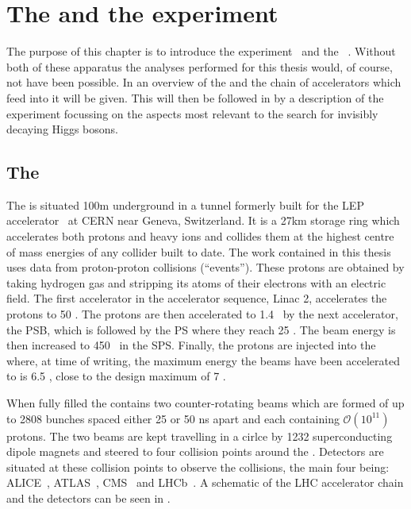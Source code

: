 \chapter{The \LHC and the \CMS experiment}
\label{chap:detector}

The purpose of this chapter is to introduce the \CMS experiment~\cite{Chatrchyan:2008aa} and the \LHC~\cite{1748-0221-3-08-S08001}. Without both of these apparatus the analyses performed for this thesis would, of course, not have been possible. In  an overview of the \LHC and the chain of accelerators which feed into it will be given. This will then be followed in  by a description of the \CMS experiment focussing on the aspects most relevant to the search for invisibly decaying Higgs bosons.

\section{The \LHC}
\label{sec:lhc}
The \LHC is situated 100m underground in a tunnel formerly built for the LEP accelerator~\cite{lepdesign} at CERN near Geneva, Switzerland. It is a 27km storage ring which accelerates both protons and heavy ions and collides them at the highest centre of mass energies of any collider built to date. The work contained in this thesis uses data from proton-proton collisions (``events''). These protons are obtained by taking hydrogen gas and stripping its atoms of their electrons with an electric field. The first accelerator in the \LHC accelerator sequence, Linac 2, accelerates the protons to 50 \MeV. The protons are then accelerated to 1.4 \GeV~by the next accelerator, the \ac{PSB}, which is followed by the \ac{PS} where they reach 25 \GeV. The beam energy is then increased to 450 \GeV~in the \ac{SPS}. Finally, the protons are injected into the \LHC where, at time of writing, the maximum energy the beams have been accelerated to is 6.5 \TeV, close to the design maximum of 7 \TeV.

When fully filled the \LHC contains two counter-rotating beams which are formed of up to 2808 bunches spaced either 25 or 50 ns apart and each containing $\mathcal{O}(10^{11})$ protons. The two beams are kept travelling in a cirlce by 1232 superconducting dipole magnets and steered to four collision points around the \LHC. Detectors are situated at these collision points to observe the collisions, the main four being: ALICE~\cite{Aamodt:2008zz}, ATLAS~\cite{Aad:1129811}, CMS~\cite{Chatrchyan:2008aa} and LHCb~\cite{Alves:2008zz}. A schematic of the LHC accelerator chain and the detectors can be seen in .

